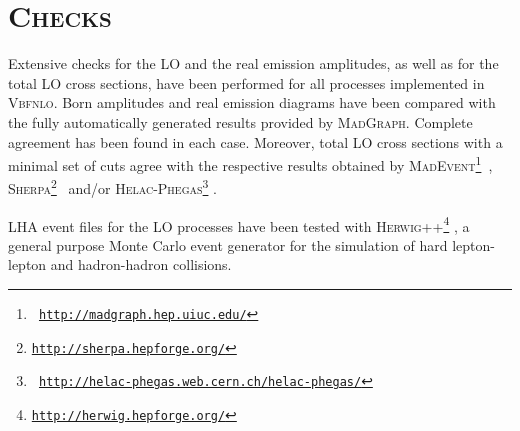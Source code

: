 \documentclass[english,12pt]{article}
\begin{document}
\newpage

\section{\textsc{Checks}}

Extensive checks for the LO and the real emission amplitudes, as well as for the
total LO cross sections, have been performed for all processes implemented in
\textsc{Vbfnlo}.  Born amplitudes and real emission diagrams have been compared
with the fully automatically generated results provided by
\textsc{MadGraph}\cite{Stelzer:1994ta}. Complete agreement has been found in
each case.  Moreover, total LO cross sections with a minimal set of cuts agree
with the respective results obtained by \textsc{MadEvent}\footnote{\tt
\href{http://madgraph.hep.uiuc.edu/}{http://madgraph.hep.uiuc.edu/}}~\cite{Maltoni:2002qb,Alwall:2007st},
\textsc{Sherpa}\footnote{\tt \href{http://sherpa.hepforge.org/}{http://sherpa.hepforge.org/}}~\cite{Gleisberg:2008ta}
and/or \textsc{Helac-Phegas}\footnote{\tt
\href{http://helac-phegas.web.cern.ch/helac-phegas/}{http://helac-phegas.web.cern.ch/helac-phegas/}}
\cite{Kanaki:2000ey,Papadopoulos:2005ky,Cafarella:2007pc}. 

LHA event files for the LO processes have been tested with
\textsc{Herwig++}\footnote{\tt \href{http://herwig.hepforge.org/}{http://herwig.hepforge.org/}}
\cite{Bahr:2008pv},  a general purpose Monte Carlo event generator for the
simulation of hard lepton-lepton and hadron-hadron collisions.
\end{document}

